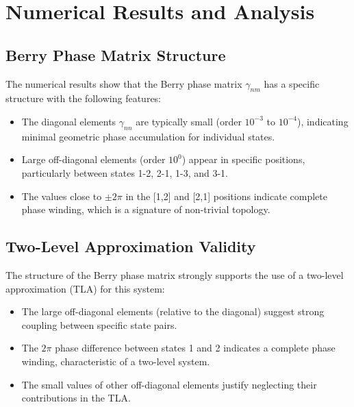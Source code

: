 \documentclass{article}
\begin{document}
\section{Numerical Results and Analysis}

\subsection{Berry Phase Matrix Structure}

The numerical results show that the Berry phase matrix $\gamma_{nm}$ has a specific structure with the following features:

\begin{itemize}
    \item The diagonal elements $\gamma_{nn}$ are typically small (order $10^{-3}$ to $10^{-4}$), indicating minimal geometric phase accumulation for individual states.
    
    \item Large off-diagonal elements (order $10^0$) appear in specific positions, particularly between states 1-2, 2-1, 1-3, and 3-1.
    
    \item The values close to $\pm 2\pi$ in the [1,2] and [2,1] positions indicate complete phase winding, which is a signature of non-trivial topology.
\end{itemize}

\subsection{Two-Level Approximation Validity}

The structure of the Berry phase matrix strongly supports the use of a two-level approximation (TLA) for this system:

\begin{itemize}
    \item The large off-diagonal elements (relative to the diagonal) suggest strong coupling between specific state pairs.
    
    \item The $2\pi$ phase difference between states 1 and 2 indicates a complete phase winding, characteristic of a two-level system.
    
    \item The small values of other off-diagonal elements justify neglecting their contributions in the TLA.
\end{itemize}
\end{document}
